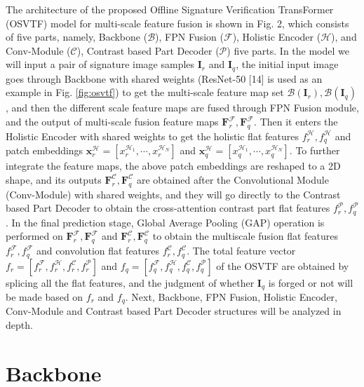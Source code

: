 The architecture of the proposed Offline Signature Verification TransFormer (OSVTF) model for multi-scale feature fusion is shown in Fig. 2, which consists of five parts, namely, Backbone ($\mathcal{B}$), FPN Fusion ($\mathcal{F}$), Holistic Encoder ($\mathcal{H}$), and Conv-Module ($\mathcal{C}$), Contrast based Part Decoder ($\mathcal{P}$) five parts. In the model we will input a pair of signature image samples $\mathbf{I}_r$ and $\mathbf{I}_q$, the initial input image goes through Backbone with shared weights (ResNet-50 [14] is used as an example in Fig. \ref{fig:osvtf}) to get the multi-scale feature map set $\mathcal{B}(\mathbf{I}_r),\mathcal{B}(\mathbf{I}_q)$, and then the different scale feature maps are fused through FPN Fusion module, and the output of multi-scale fusion feature maps $\mathbf{F}_r^\mathcal{F},\mathbf{F}_q^\mathcal{F}$. Then it enters the Holistic Encoder with shared weights to get the holistic flat features $f_r^\mathcal{H},f_q^\mathcal{H}$ and patch embeddings $\boldsymbol{x}_r^\mathcal{H}=[x_r^{\mathcal{H}_1 }, \cdots, x_r^{\mathcal{H}_N} ]$ and $\boldsymbol{x}_q^\mathcal{H} = [ x_q^{\mathcal{H}_1}, \cdots, x_q^{\mathcal{H}_N} ]$. To further integrate the feature maps, the above patch embeddings are reshaped to a 2D shape, and its outputs $\mathbf{F}_r^\mathcal{C}, \mathbf{F}_q^\mathcal{C}$ are obtained after the Convolutional Module (Conv-Module) with shared weights, and they will go directly to the Contrast based Part Decoder to obtain the cross-attention contrast part flat features $f_r^\mathcal{P},f_q^\mathcal{P}$. In the final prediction stage, Global Average Pooling (GAP) operation is performed on $\mathbf{F}_r^\mathcal{F},\mathbf{F}_q^\mathcal{F}$ and $\mathbf{F}_r^\mathcal{C},\mathbf{F}_q^\mathcal{C}$ to obtain the multiscale fusion flat features $f_r^\mathcal{F},f_q^\mathcal{F}$ and convolution flat features $f_r^\mathcal{C},f_q^\mathcal{C}$. The total feature vector $f_r=[f_r^\mathcal{F},f_r^\mathcal{H},f_r^\mathcal{C},f_r^\mathcal{P} ]$ and $f_q=[f_q^\mathcal{F},f_q^\mathcal{H},f_q^\mathcal{C},f_q^\mathcal{P} ]$ of the OSVTF are obtained by splicing all the flat features, and the judgment of whether $\mathbf{I}_q$ is forged or not will be made based on $f_r$ and $f_q$. Next, Backbone, FPN Fusion, Holistic Encoder, Conv-Module and Contrast based Part Decoder structures will be analyzed in depth.

\section{Backbone}

